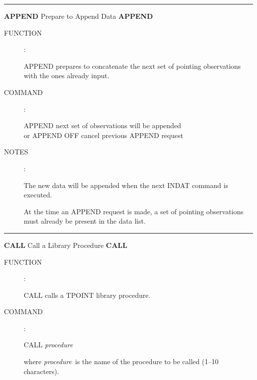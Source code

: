 \goodbreak
\rule{\textwidth}{0.3mm}
{\Large {\bf APPEND} \hfill Prepare to Append Data \hfill {\bf APPEND}}
\begin{description}
\item [FUNCTION]:

APPEND prepares to concatenate the next set of pointing
observations with the ones already input.

\item [COMMAND]:

\begin{cmd}
\> \> APPEND \> next set of observations will be appended \\
\> or \> APPEND OFF \> cancel previous APPEND request
\end{cmd}

\item [NOTES]:

The new data will be appended when the next INDAT command is
executed.

At the time an APPEND request is made, a set of pointing
observations must already be present in the data list.

\end{description}


\goodbreak
\rule{\textwidth}{0.3mm}
{\Large {\bf CALL} \hfill Call a Library Procedure \hfill {\bf CALL}}
\begin{description}
\item [FUNCTION]:

CALL calls a TPOINT library procedure.

\item [COMMAND]:

\begin{cmd}
\> \> CALL {\it procedure}
\end{cmd}

where {\it procedure}\, is the name of the procedure to be
called (1--10 characters).

\end{description}


